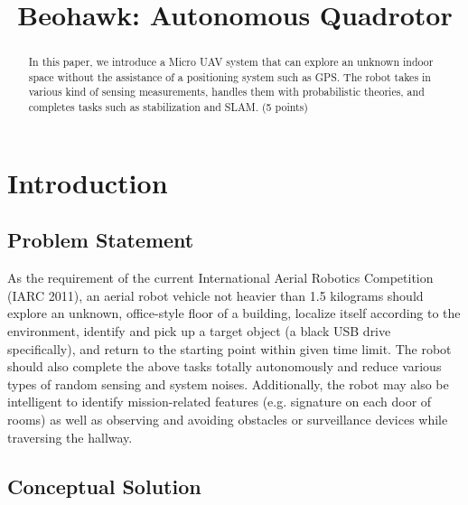 \documentclass[12pt, letterpaper]{article}
\title{Beohawk: Autonomous Quadrotor}
\begin{document}
\maketitle
\begin{people}
\end{people}

\begin{abstract}
	In this paper, we introduce a Micro UAV system that can explore an unknown indoor space without the assistance of a positioning system such as GPS. The robot takes in various kind of sensing measurements, handles them with probabilistic theories, and completes tasks such as stabilization and SLAM.  (5 points)
\end{abstract}

\section{Introduction}

\subsection{Problem Statement}

As the requirement of the current International Aerial Robotics Competition (IARC 2011), an aerial robot vehicle not heavier than 1.5 kilograms should explore an unknown, office-style floor of a building, localize itself according to the environment, identify and pick up a target object (a black USB drive specifically), and return to the starting point within given time limit. The robot should also complete the above tasks totally autonomously and reduce various types of random sensing and system noises. Additionally, the robot may also be intelligent to identify mission-related features (e.g. signature on each door of rooms) as well as observing and avoiding obstacles or surveillance devices while traversing the hallway.

\subsection{Conceptual Solution}
\end{document}
